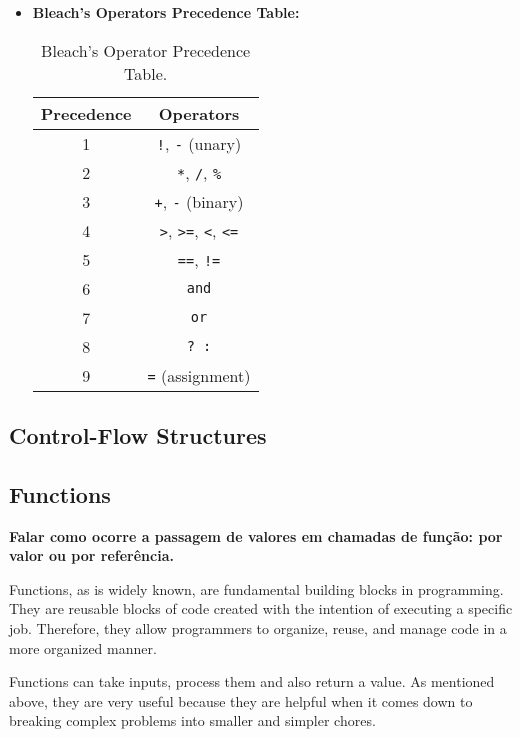 \begin{itemize}
    \item \textbf{Bleach's Operators Precedence Table:}
        \begin{table}[H]
        \centering
        \begin{tabular}{|c|c|}
            \hline
            \textbf{Precedence} & \textbf{Operators} \\  %
            \hline
            1 & \texttt{!}, \texttt{-} (unary) \\  %
            \hline
            2 & \texttt{*}, \texttt{/}, \texttt{\%} \\
            \hline
            3 & \texttt{+}, \texttt{-} (binary) \\
            \hline
            4 & \texttt{>}, \texttt{>=}, \texttt{<}, \texttt{<=} \\
            \hline
            5 & \texttt{==}, \texttt{!=} \\
            \hline
            6 & \texttt{and} \\
            \hline
            7 & \texttt{or} \\
            \hline
            8 & \texttt{? :} \\
            \hline
            9 & \texttt{=} (assignment) \\
            \hline
        \end{tabular}
        \caption{Bleach's Operator Precedence Table.}
        \label{tab:example}
        \end{table}
\end{itemize}

\subsection{Control-Flow Structures}


\subsection{Functions}
\textbf{Falar como ocorre a passagem de valores em chamadas de função: por valor ou por referência.}

Functions, as is widely known, are fundamental building blocks in programming. They are reusable blocks of code created with the intention of executing a specific job. Therefore, they allow programmers to organize, reuse, and manage code in a more organized manner.

Functions can take inputs, process them and also return a value. As mentioned above, they are very useful because they are helpful when it comes down to breaking complex problems into smaller and simpler chores.


